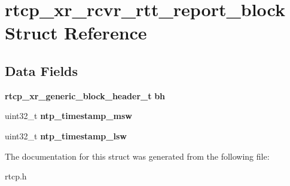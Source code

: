 \section{rtcp\+\_\+xr\+\_\+rcvr\+\_\+rtt\+\_\+report\+\_\+block Struct Reference}
\label{structrtcp__xr__rcvr__rtt__report__block}
\subsection*{Data Fields}
\begin{DoxyCompactItemize}
\item 
\mbox{\label{structrtcp__xr__rcvr__rtt__report__block_ac9941071a0ca27916aa17ec00a3a110a}} 
\textbf{ rtcp\+\_\+xr\+\_\+generic\+\_\+block\+\_\+header\+\_\+t} {\bfseries bh}
\item 
\mbox{\label{structrtcp__xr__rcvr__rtt__report__block_aa7162326f9a1f99ab7797a5c40a52e9a}} 
uint32\+\_\+t {\bfseries ntp\+\_\+timestamp\+\_\+msw}
\item 
\mbox{\label{structrtcp__xr__rcvr__rtt__report__block_ad9b1a3cc08ac9984fe991fa156fb3657}} 
uint32\+\_\+t {\bfseries ntp\+\_\+timestamp\+\_\+lsw}
\end{DoxyCompactItemize}


The documentation for this struct was generated from the following file\+:\begin{DoxyCompactItemize}
\item 
rtcp.\+h\end{DoxyCompactItemize}
